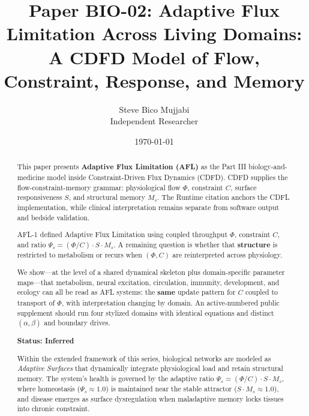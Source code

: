 \documentclass[11pt]{article}
\title{\textbf{Paper BIO-02: Adaptive Flux Limitation Across Living Domains:\\ A CDFD Model of Flow, Constraint, Response, and Memory}}
\author{Steve Bico Mujjabi\\ \small Independent Researcher}
\date{\today}
\begin{document}
\maketitle

\begin{abstract}

This paper presents \textbf{Adaptive Flux Limitation (AFL)} as the Part III biology-and-medicine model inside Constraint-Driven Flux Dynamics (CDFD). CDFD supplies the flow-constraint-memory grammar: physiological flow $\Phi$, constraint $C$, surface responsiveness $S$, and structural memory $M_s$. The Runtime citation anchors the CDFL implementation, while clinical interpretation remains separate from software output and bedside validation.

AFL-1 defined Adaptive Flux Limitation using coupled throughput $\Phi$,
constraint $C$, and ratio $\Psi_s=(\Phi/C) \cdot S \cdot M_s$. A remaining
question is whether that \textbf{structure} is restricted to metabolism or
recurs when $(\Phi,C)$ are reinterpreted across physiology.

We show---at the level of a shared dynamical skeleton plus domain-specific parameter maps---that metabolism, neural excitation, circulation, immunity, development, and ecology can all be read as AFL systems: the \textbf{same} update pattern for $C$ coupled to transport of $\Phi$, with interpretation changing by domain. An active-numbered public supplement should run four stylized domains with identical equations and distinct $(\alpha,\beta)$ and boundary drives.

\textbf{Status: Inferred}

\medskip
\noindent Within the extended framework of this series, biological networks are modeled as \emph{Adaptive Surfaces} that dynamically integrate physiological load and retain structural memory. The system's health is governed by the adaptive ratio $\Psi_s = (\Phi/C) \cdot S \cdot M_s$, where homeostasis ($\Psi_s \approx 1.0$) is maintained near the stable attractor ($S \cdot M_s \approx 1.0$), and disease emerges as surface dysregulation when maladaptive memory locks tissues into chronic constraint.

\end{abstract}
\end{document}
